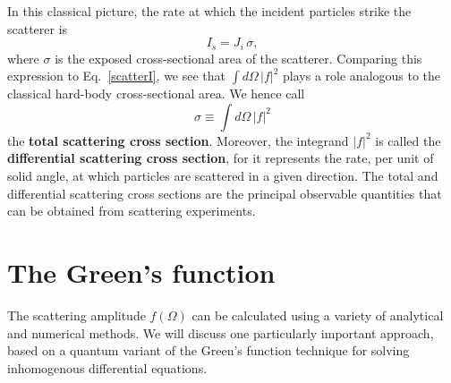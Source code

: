 \documentclass[pra,12pt]{revtex4}
\begin{document}
\noindent
In this classical picture, the rate at which the incident particles
strike the scatterer is
\begin{equation}
  I_s = J_i \, \sigma,
\end{equation}
where $\sigma$ is the exposed cross-sectional area of the scatterer.
Comparing this expression to Eq.~\eqref{scatterI}, we see that $\int
d\Omega\,|f|^2$ plays a role analogous to the classical hard-body
cross-sectional area.  We hence call
\begin{equation*}
  \sigma \equiv \int d\Omega\,|f|^2
\end{equation*}
the \textbf{total scattering cross section}.  Moreover, the integrand
$|f|^2$ is called the \textbf{differential scattering cross section},
for it represents the rate, per unit of solid angle, at which
particles are scattered in a given direction.  The total and
differential scattering cross sections are the principal observable
quantities that can be obtained from scattering experiments.

\section{The Green's function}
\label{sec:greensfun}

The scattering amplitude $f(\Omega)$ can be calculated using a variety
of analytical and numerical methods.  We will discuss one particularly
important approach, based on a quantum variant of the Green's function
technique for solving inhomogenous differential equations.
\end{document}
